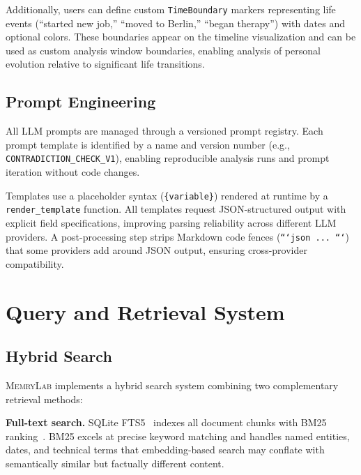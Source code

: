 \documentclass[manuscript,review]{acmart}
\begin{document}
Additionally, users can define custom \texttt{TimeBoundary} markers representing life events (``started new job,'' ``moved to Berlin,'' ``began therapy'') with dates and optional colors.
These boundaries appear on the timeline visualization and can be used as custom analysis window boundaries, enabling analysis of personal evolution relative to significant life transitions.

\subsection{Prompt Engineering}
\label{sec:prompts}

All LLM prompts are managed through a versioned prompt registry.
Each prompt template is identified by a name and version number (e.g., \texttt{CONTRADICTION\_CHECK\_V1}), enabling reproducible analysis runs and prompt iteration without code changes.

Templates use a placeholder syntax (\texttt{\{variable\}}) rendered at runtime by a \texttt{render\_template} function.
All templates request JSON-structured output with explicit field specifications, improving parsing reliability across different LLM providers.
A post-processing step strips Markdown code fences (\texttt{```json ... ```}) that some providers add around JSON output, ensuring cross-provider compatibility.


\section{Query and Retrieval System}
\label{sec:query}

\subsection{Hybrid Search}
\label{sec:hybrid-search}

\textsc{MemryLab} implements a hybrid search system combining two complementary retrieval methods:

\textbf{Full-text search.}
SQLite FTS5~\cite{sqlite2023fts5} indexes all document chunks with BM25 ranking~\cite{robertson2009bm25}.
BM25 excels at precise keyword matching and handles named entities, dates, and technical terms that embedding-based search may conflate with semantically similar but factually different content.
\end{document}
